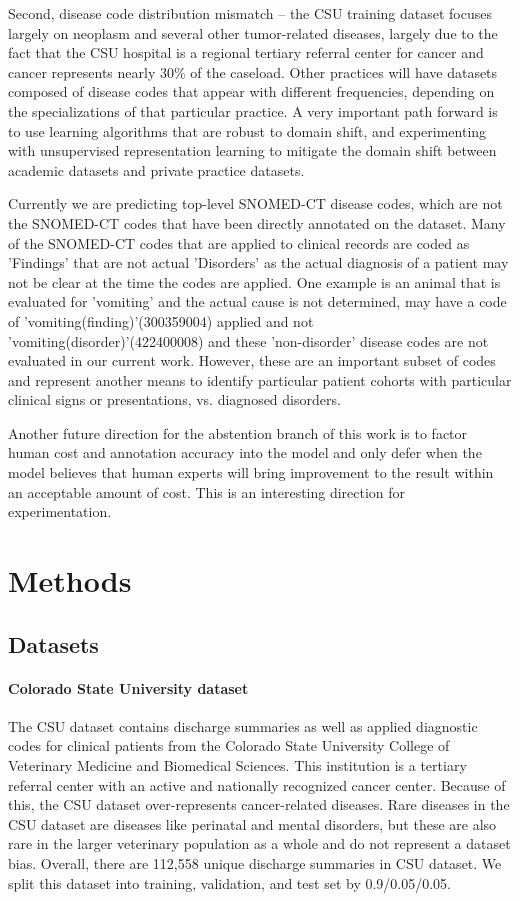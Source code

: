 \documentclass{article}[11pt,oneside]
\begin{document}
Second, disease code distribution mismatch -- the CSU training dataset focuses largely on neoplasm and several other tumor-related diseases, largely due to the fact that the CSU hospital is a regional tertiary referral center for cancer and cancer represents nearly 30\% of the caseload. Other practices will have datasets composed of disease codes that appear with different frequencies, depending on the specializations of that particular practice. A very important path forward is to use learning algorithms that are robust to domain shift, and experimenting with unsupervised representation learning to mitigate the domain shift between academic datasets and private practice datasets.

Currently we are predicting top-level SNOMED-CT disease codes, which are not the SNOMED-CT codes that have been directly annotated on the dataset. Many of the SNOMED-CT codes that are applied to clinical records are coded as 'Findings' that are not actual 'Disorders' as the actual diagnosis of a patient may not be clear at the time the codes are applied.  One example is an animal that is evaluated for 'vomiting' and the actual cause is not determined, may have a code of 'vomiting(finding)'(300359004) applied and not 'vomiting(disorder)'(422400008) and these 'non-disorder' disease codes are not evaluated in our current work.  However, these are an important subset of codes and represent another means to identify particular patient cohorts with particular clinical signs or presentations, vs. diagnosed disorders. 

Another future direction for the abstention branch of this work is to factor human cost and annotation accuracy into the model and only defer when the model believes that human experts will bring improvement to the result within an acceptable amount of cost. This is an interesting direction for experimentation.

\section*{Methods}

\subsection*{Datasets}

\paragraph{Colorado State University dataset}
The CSU dataset contains discharge summaries as well as applied diagnostic codes for clinical patients from the Colorado State University College of Veterinary Medicine and Biomedical Sciences. 
This institution is a tertiary referral center with an active and nationally recognized cancer center. Because of this, the CSU dataset over-represents cancer-related diseases. Rare diseases in the CSU dataset are diseases like  perinatal and mental disorders, but these are also rare in the larger veterinary population as a whole and do not represent a dataset bias. Overall, there are 112,558 unique discharge summaries in CSU dataset.  We split this dataset into training, validation, and test set by 0.9/0.05/0.05. 
\end{document}
